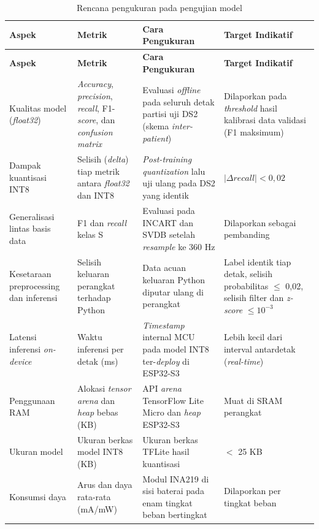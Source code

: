\begin{center}
  \setlength{\tabcolsep}{4pt}
  \renewcommand{\arraystretch}{1.15}
  \small
  \begin{longtable}{|>{\RaggedRight\arraybackslash}p{2.5cm}|>{\RaggedRight\arraybackslash}p{3.2cm}|>{\RaggedRight\arraybackslash}p{4.6cm}|>{\RaggedRight\arraybackslash}p{2.5cm}|}
    \caption{Rencana pengukuran pada pengujian model}
    \label{tab:pengujian-model} \\
    \hline
    \rowcolor{headgray}
    \textbf{Aspek} & \textbf{Metrik} & \textbf{Cara Pengukuran} & \textbf{Target Indikatif} \\
    \hline
    \endfirsthead
    \hline
    \rowcolor{headgray}
    \textbf{Aspek} & \textbf{Metrik} & \textbf{Cara Pengukuran} & \textbf{Target Indikatif} \\
    \hline
    \endhead
    \hline
    \endfoot
    Kualitas model (\textit{float32}) &
    \textit{Accuracy}, \textit{precision}, \textit{recall}, F1-\textit{score}, dan \textit{confusion matrix} &
    Evaluasi \textit{offline} pada seluruh detak partisi uji DS2 (skema \textit{inter-patient}) &
    Dilaporkan pada \textit{threshold} hasil kalibrasi data validasi (F1 maksimum) \\
    \hline
    Dampak kuantisasi INT8 &
    Selisih (\textit{delta}) tiap metrik antara \textit{float32} dan INT8 &
    \textit{Post-training quantization} lalu uji ulang pada DS2 yang identik &
    $|\Delta \textit{recall}| < 0{,}02$ \\
    \hline
    Generalisasi lintas basis data &
    F1 dan \textit{recall} kelas S &
    Evaluasi pada INCART dan SVDB setelah \emph{resample} ke 360 Hz &
    Dilaporkan sebagai pembanding \\
    \hline
    Kesetaraan preprocessing dan inferensi &
    Selisih keluaran perangkat terhadap Python &
    Data acuan keluaran Python diputar ulang di perangkat &
    Label identik tiap detak, selisih probabilitas $\leq$ 0,02, selisih filter dan \textit{z-score} $\leq 10^{-3}$ \\
    \hline
    Latensi inferensi \textit{on-device} &
    Waktu inferensi per detak (ms) &
    \textit{Timestamp} internal MCU pada model INT8 ter-\textit{deploy} di ESP32-S3 &
    Lebih kecil dari interval antardetak (\textit{real-time}) \\
    \hline
    Penggunaan RAM &
    Alokasi \textit{tensor arena} dan \textit{heap} bebas (KB) &
    API \textit{arena} TensorFlow Lite Micro dan \textit{heap} ESP32-S3 &
    Muat di SRAM perangkat \\
    \hline
    Ukuran model &
    Ukuran berkas model INT8 (KB) &
    Ukuran berkas TFLite hasil kuantisasi &
    $<$ 25 KB \\
    \hline
    Konsumsi daya &
    Arus dan daya rata-rata (mA/mW) &
    Modul INA219 di sisi baterai pada enam tingkat beban bertingkat &
    Dilaporkan per tingkat beban \\
    \hline
  \end{longtable}
\end{center}

